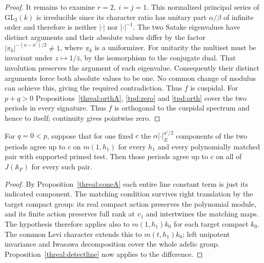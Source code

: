 \begin{proof}
It remains to examine \(r=2,\ i=j=1\). This normalized principal
series of \(\mathrm{GL}_2(k)\) is irreducible since its character
ratio has unitary part \(\alpha/\beta\) of infinite order and
therefore is neither \(|\cdot|\) nor \(|\cdot|^{-1}\).
The two Satake eigenvalues have distinct arguments and their
absolute values differ by the factor
\(|\pi_k|^{-(a-a')/2}\ne1\), where \(\pi_k\) is a uniformizer.
For unitarity the multiset must be invariant under
\(z\mapsto1/\bar z\), by the isomorphism to the conjugate dual.
That involution preserves the argument of each eigenvalue.
Consequently their distinct arguments force both absolute values
to be one. No common change of modulus can achieve this, giving the
required contradiction. Thus \(f\) is cuspidal. For \(p+q>0\)
Propositions~\ref{threal:orthA}, \ref{tpd:zero} and \ref{tpd:orth}
cover the two periods in every signature. Thus \(f\) is orthogonal
to the cuspidal spectrum and hence to itself; continuity gives
pointwise zero.
\end{proof}

\begin{corollary}\label{threal:endA}
For \(q=0<p\), suppose that for one fixed \(c\) the
\(\alpha|\cdot|_E^{a'/2}\) components of the two periods agree up to
\(c\) on \(m(1,h_1)\) for every \(h_1\) and every polynomially
matched pair with supported primed test. Then those periods agree
up to \(c\) on all of \(J(\mathbb A_F)\) for every such pair.
\end{corollary}
\begin{proof}
By Proposition~\ref{threal:coneA} each entire line constant term
is just its indicated component. The matching condition survives
right translation by the target compact group: its real compact
action preserves the polynomial module, and its finite action
preserves full rank at \(v_1\) and intertwines the matching maps.
The hypothesis therefore applies also to \(m(1,h_1)k_0\) for each
target compact \(k_0\). The common Levi character extends this to
\(m(t,h_1)k_0\); left unipotent invariance and Iwasawa decomposition
cover the whole adelic group. Proposition~\ref{threal:detectline}
now applies to the difference.
\end{proof}


